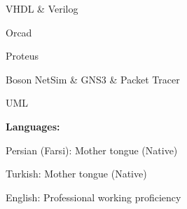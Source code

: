 \begin{cventries}
    {} %
    {} %
    {} %
    {
      \begin{cvitems} %
       {\item {VHDL \& Verilog}
       \item{Orcad}
        \item{Proteus}
        \item{Boson NetSim \& GNS3 \& Packet Tracer}
        \item{UML}
      }\end{cvitems}
    }
\cventry
    {\textbf{Languages:}} %
    {} %
    {} %
    {} %
    {
      \begin{cvitems} %
       {\item {Persian (Farsi): Mother tongue (Native)}
       \item {Turkish: Mother tongue (Native)}
       \item{English: Professional working proficiency}
      }\end{cvitems}
    }
\end{cventries}

